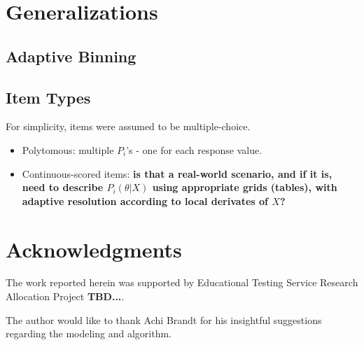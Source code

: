\documentclass{article}
\newcommand{\ta}{\theta}
\begin{document}


\section{Generalizations}
\label{general}

\subsection{Adaptive Binning}
\label{adaptive_grid}

\subsection{Item Types}
For simplicity, items were assumed to be multiple-choice.
\begin{itemize}
	\item Polytomous: multiple $P_i$'s - one for each response value.
	\item Continuous-scored items: {\bf is that a real-world scenario, and if it is, 
	need to describe $P_i(\ta|X)$ using appropriate grids (tables), with adaptive resolution
	according to local derivates of $X$?}
\end{itemize}

\section{Acknowledgments}
The work reported herein was supported by Educational Testing Service Research Allocation Project {\bf TBD...}.

The author would like to thank Achi Brandt for his insightful suggestions regarding the modeling and algorithm.



\end{document}
